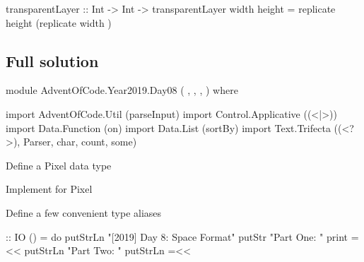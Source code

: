 \nwenddocs{}\endmoddef\nwstartdeflinemarkup{}\nwenddeflinemarkup
transparentLayer :: Int -> Int -> 
transparentLayer width height = replicate height (replicate width )
\nwendcode{}\nwdocspar


\subsection{Full solution}

\nwenddocs{}\endmoddef\nwstartdeflinemarkup\nwenddeflinemarkup
module AdventOfCode.Year2019.Day08
  ( ,
    ,
    ,
  )
where

import AdventOfCode.Util (parseInput)
import Control.Applicative ((<|>))
import Data.Function (on)
import Data.List (sortBy)
import Text.Trifecta ((<?>), Parser, char, count, some)

\LA{}Define a Pixel data type~{\nwtagstyle{}}\RA{}

\LA{}Implement  for \code{}Pixel\edoc{}~{\nwtagstyle{}}\RA{}

\LA{}Define a few convenient type aliases~{\nwtagstyle{}}\RA{}

 :: IO ()
 =
  do
    putStrLn "[2019] Day 8: Space  Format"
    putStr "Part One: "
    print =<< 
    putStrLn "Part Two: "
    putStrLn =<< 

